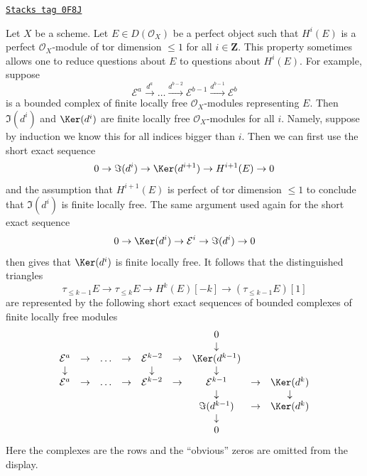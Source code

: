 \begin{remark}
\label{flat-remark-when-you-have-a-complex}
\href{https://stacks.math.columbia.edu/tag/0F8J}{\texttt{Stacks tag 0F8J}}

Let $X$ be a scheme. Let $E \in D(\mathcal{O}_X)$ be a perfect object such
that $H^i(E)$ is a perfect $\mathcal{O}_X$-module of tor dimension $\leq 1$
for all $i \in \mathbf{Z}$. This property sometimes allows one to reduce
questions about $E$ to questions about $H^i(E)$. For example, suppose
$$
\mathcal{E}^a \xrightarrow{d^a} \ldots
\xrightarrow{d^{b - 2}} \mathcal{E}^{b - 1}
\xrightarrow{d^{b - 1}} \mathcal{E}^b
$$
is a bounded complex of finite locally free $\mathcal{O}_X$-modules
representing $E$. Then $\Im(d^i)$ and $\Ker(d^i)$ are finite locally
free $\mathcal{O}_X$-modules for all $i$. Namely, suppose by induction
we know this for all indices bigger than $i$. Then we can first use the
short exact sequence
$$
0 \to \Im(d^i) \to \Ker(d^{i + 1}) \to H^{i + 1}(E) \to 0
$$
and the assumption that $H^{i + 1}(E)$ is perfect of tor dimension $\leq 1$
to conclude that $\Im(d^i)$ is finite locally free.
The same argument used again for the short exact sequence
$$
0 \to \Ker(d^i) \to \mathcal{E}^i \to \Im(d^i) \to 0
$$
then gives that $\Ker(d^i)$ is finite locally free.
It follows that the distinguished triangles
$$
\tau_{\leq k - 1}E \to \tau_{\leq k}E \to H^k(E)[-k] \to
(\tau_{\leq k - 1}E)[1]
$$
are represented by the following short exact sequences of
bounded complexes of finite locally free modules
$$
\begin{matrix}
& &
& &
& &
0 \\
& &
& &
& &
\downarrow \\
\mathcal{E}^a & \to &
\ldots & \to &
\mathcal{E}^{k - 2} & \to &
\Ker(d^{k - 1}) \\
\downarrow & &
& &
\downarrow & &
\downarrow \\
\mathcal{E}^a & \to &
\ldots & \to &
\mathcal{E}^{k - 2} & \to &
\mathcal{E}^{k - 1} & \to &
\Ker(d^k) \\
& &
& &
& &
\downarrow & &
\downarrow \\
& &
& &
& &
\Im(d^{k - 1}) & \to &
\Ker(d^k) \\
& &
& &
& &
\downarrow \\
& &
& &
& &
0
\end{matrix}
$$
Here the complexes are the rows and the ``obvious'' zeros
are omitted from the display.
\end{remark}

